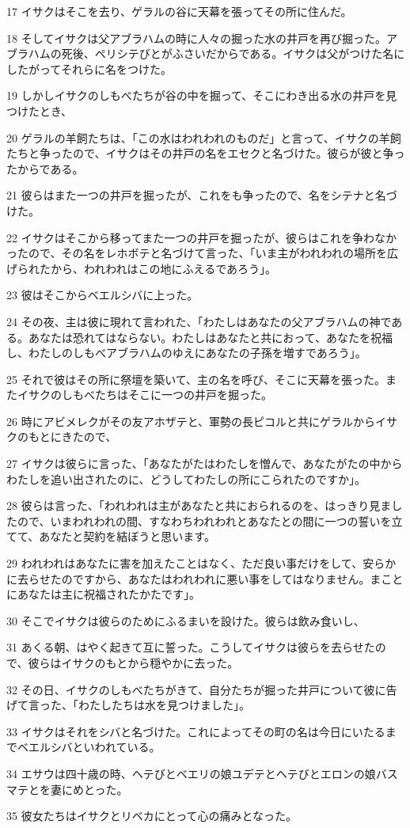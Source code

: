 \par 17 イサクはそこを去り、ゲラルの谷に天幕を張ってその所に住んだ。
\par 18 そしてイサクは父アブラハムの時に人々の掘った水の井戸を再び掘った。アブラハムの死後、ペリシテびとがふさいだからである。イサクは父がつけた名にしたがってそれらに名をつけた。
\par 19 しかしイサクのしもべたちが谷の中を掘って、そこにわき出る水の井戸を見つけたとき、
\par 20 ゲラルの羊飼たちは、「この水はわれわれのものだ」と言って、イサクの羊飼たちと争ったので、イサクはその井戸の名をエセクと名づけた。彼らが彼と争ったからである。
\par 21 彼らはまた一つの井戸を掘ったが、これをも争ったので、名をシテナと名づけた。
\par 22 イサクはそこから移ってまた一つの井戸を掘ったが、彼らはこれを争わなかったので、その名をレホボテと名づけて言った、「いま主がわれわれの場所を広げられたから、われわれはこの地にふえるであろう」。
\par 23 彼はそこからベエルシバに上った。
\par 24 その夜、主は彼に現れて言われた、「わたしはあなたの父アブラハムの神である。あなたは恐れてはならない。わたしはあなたと共におって、あなたを祝福し、わたしのしもべアブラハムのゆえにあなたの子孫を増すであろう」。
\par 25 それで彼はその所に祭壇を築いて、主の名を呼び、そこに天幕を張った。またイサクのしもべたちはそこに一つの井戸を掘った。
\par 26 時にアビメレクがその友アホザテと、軍勢の長ピコルと共にゲラルからイサクのもとにきたので、
\par 27 イサクは彼らに言った、「あなたがたはわたしを憎んで、あなたがたの中からわたしを追い出されたのに、どうしてわたしの所にこられたのですか」。
\par 28 彼らは言った、「われわれは主があなたと共におられるのを、はっきり見ましたので、いまわれわれの間、すなわちわれわれとあなたとの間に一つの誓いを立てて、あなたと契約を結ぼうと思います。
\par 29 われわれはあなたに害を加えたことはなく、ただ良い事だけをして、安らかに去らせたのですから、あなたはわれわれに悪い事をしてはなりません。まことにあなたは主に祝福されたかたです」。
\par 30 そこでイサクは彼らのためにふるまいを設けた。彼らは飲み食いし、
\par 31 あくる朝、はやく起きて互に誓った。こうしてイサクは彼らを去らせたので、彼らはイサクのもとから穏やかに去った。
\par 32 その日、イサクのしもべたちがきて、自分たちが掘った井戸について彼に告げて言った、「わたしたちは水を見つけました」。
\par 33 イサクはそれをシバと名づけた。これによってその町の名は今日にいたるまでベエルシバといわれている。
\par 34 エサウは四十歳の時、ヘテびとベエリの娘ユデテとヘテびとエロンの娘バスマテとを妻にめとった。
\par 35 彼女たちはイサクとリベカにとって心の痛みとなった。

